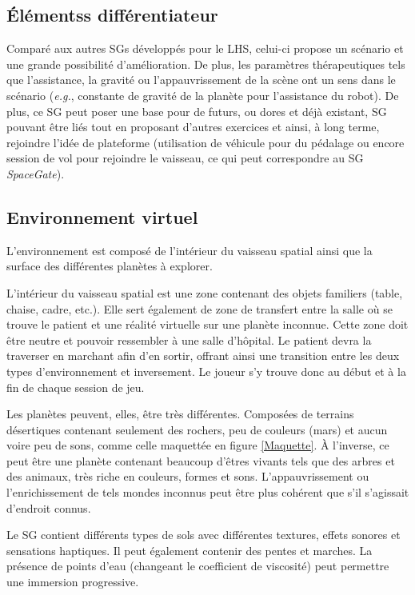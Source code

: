 	\subsection*{Élémentss différentiateur}		
		Comparé aux autres SGs développés pour le LHS, celui-ci propose un scénario et une grande possibilité d'amélioration. De plus, les paramètres thérapeutiques tels que l'assistance, la gravité ou l'appauvrissement de la scène ont un sens dans le scénario (\textit{e.g.}, constante de gravité de la planète pour l'assistance du robot). De plus, ce SG peut poser une base pour de futurs, ou dores et déjà existant, SG pouvant être liés tout en proposant d'autres exercices et ainsi, à long terme, rejoindre l'idée de plateforme (utilisation de véhicule pour du pédalage ou encore session de vol pour rejoindre le vaisseau, ce qui peut correspondre au SG \textit{SpaceGate}).
	
	\subsection*{Environnement virtuel}
		L'environnement est composé de l'intérieur du vaisseau spatial ainsi que la surface des différentes planètes à explorer.
		
		L'intérieur du vaisseau spatial est une zone contenant des objets familiers (table, chaise, cadre, etc.). Elle sert également de zone de transfert entre la salle où se trouve le patient et une réalité virtuelle sur une planète inconnue. Cette zone doit être neutre et pouvoir ressembler à une salle d'hôpital. Le patient devra la traverser en marchant afin d'en sortir, offrant ainsi une transition entre les deux types d'environnement et inversement. Le joueur s'y trouve donc au début et à la fin de chaque session de jeu.
		
		Les planètes peuvent, elles, être très différentes. Composées de terrains désertiques contenant seulement des rochers, peu de couleurs (mars) et aucun voire peu de sons, comme celle maquettée en figure \ref{Maquette}. À l'inverse, ce peut être une planète contenant beaucoup d'êtres vivants tels que des arbres et des animaux, très riche en couleurs, formes et sons. L'appauvrissement ou l'enrichissement de tels mondes inconnus peut être plus cohérent que s'il s'agissait d'endroit connus. 
		
		Le SG contient différents types de sols avec différentes textures, effets sonores et sensations haptiques. Il peut également contenir des pentes et marches. La présence de points d'eau (changeant le coefficient de viscosité) peut permettre une immersion progressive.\medskip			
		
